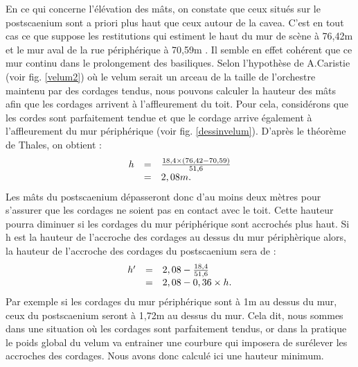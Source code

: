 En ce qui concerne l'élévation des mâts, on constate que ceux situés sur le \gls{postscaenium} sont a priori plus haut que ceux autour de la \gls{cavea}. C'est en tout cas ce que suppose les restitutions qui estiment le haut du mur de scène à 76,42m et le mur aval de la rue périphérique à 70,59m \cite[Pl. XLVIII et XLIX]{orangePl}. Il semble en effet cohérent que ce mur continu dans le prolongement des \glspl{basilique}. Selon l'hypothèse de A.Caristie (voir fig. \ref{velum2}) où le \gls{velum} serait un arceau de la taille de l'orchestre maintenu par des cordages tendus, nous pouvons calculer la hauteur des mâts afin que les cordages arrivent à l'affleurement du toit. Pour cela, considérons que les cordes sont parfaitement tendue et que le cordage arrive également à l'affleurement du mur périphérique (voir fig. \ref{dessinvelum}). D'après le théorème de Thales, on obtient :
%
\begin{equation}
	\begin{array}{r c l}
		h & = & \frac{18,4\times(76,42-70,59)}{51,6} \\
		 & = & 2, 08m.
	\end{array}
\end{equation}
%
Les mâts du \gls{postscaenium} dépasseront donc d'au moins deux mètres pour s'assurer que les cordages ne soient pas en contact avec le toit. Cette hauteur pourra diminuer si les cordages du mur périphérique sont accrochés plus haut. Si h est la hauteur de l'accroche des cordages au dessus du mur périphèrique alors, la hauteur de l'accroche des cordages du \gls{postscaenium} sera de :
%
\begin{equation}
	\begin{array}{r c l}
		h' & = & 2,08 - \frac{18,4}{51,6} \\
		& = & 2, 08 - 0,36 \times h.
	\end{array}
\end{equation}
%
Par exemple si les cordages du mur périphérique sont à 1m au dessus du mur, ceux du \gls{postscaenium} seront à 1,72m au dessus du mur. Cela dit, nous sommes dans une situation où les cordages sont parfaitement tendus, or dans la pratique le poids global du velum va entrainer une courbure qui imposera de surélever les accroches des cordages. Nous avons donc calculé ici une hauteur minimum. 

